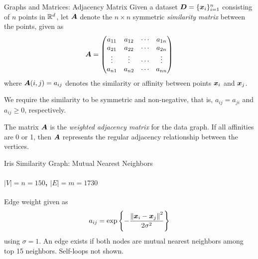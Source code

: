 
\date{Chapter 16: Spectral \& Graph Clustering}

\begin{frame}
\titlepage
\end{frame}

\begin{frame}{Graphs and Matrices: Adjacency Matrix}
Given a dataset ${\boldsymbol D} = \{{\boldsymbol x}_i \}_{i=1}^n$ consisting of $n$ points in ${\mathord{\mathbb R}}^d$, let ${\boldsymbol A}$
denote the $n \times n$ symmetric {\em similarity matrix} between
the points, given as
\begin{align*}
    {\boldsymbol A} = \begin{pmatrix} 
        a_{11} & a_{12} & \cdots & a_{1n}\\
        a_{21} & a_{22} & \cdots & a_{2n}\\
        \vdots & \vdots & \cdots & \vdots\\
        a_{n1} & a_{n2} & \cdots & a_{nn}\\
     \end{pmatrix}
\end{align*}
where ${\boldsymbol A}(i,j) = a_{ij}$ denotes the similarity or aff\/{i}nity
between points ${\boldsymbol x}_i$ and ${\boldsymbol x}_{j}$. 

\medskip
We require the similarity to
be symmetric and non-negative, that is, $a_{ij} = a_{ji}$ and $a_{ij}
\ge 0$, respectively. 

\medskip
The matrix ${\boldsymbol A}$ is 
the {\em weighted adjacency matrix} for the data graph.
If all aff\/{i}nities are 0 or 1, then ${\boldsymbol A}$ represents
the regular adjacency relationship between the vertices.
\end{frame}


\begin{frame}{Iris Similarity Graph: Mutual Nearest Neighbors}
  \framesubtitle{$|V|=n=150$, $|E|=m=1730$}
\begin{figure}
    \centerline{
    }
\end{figure}
Edge weight given as
\begin{align*}
    a_{ij} =
    \exp \left\{-{\left\lVert{\boldsymbol x}_i - {\boldsymbol x}_{j}\right\rVert^2 \over 2\sigma^2} \right\}
\end{align*}
using $\sigma=1$. An edge exists if both nodes are mutual nearest
neighbors among top 15 neighbors. Self-loops not shown.
\end{frame}




